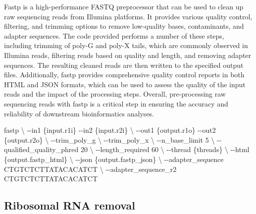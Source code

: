 \documentclass[
]{book}
\newenvironment{Shaded}{\begin{snugshade}}{\end{snugshade}}
\newcommand{\AttributeTok}[1]{\textcolor[rgb]{0.77,0.63,0.00}{#1}}
\newcommand{\DataTypeTok}[1]{\textcolor[rgb]{0.13,0.29,0.53}{#1}}
\newcommand{\ExtensionTok}[1]{#1}
\newcommand{\NormalTok}[1]{#1}
\begin{document}
Fastp is a high-performance FASTQ preprocessor that can be used to clean up raw sequencing reads from Illumina platforms. It provides various quality control, filtering, and trimming options to remove low-quality bases, contaminants, and adapter sequences. The code provided performs a number of these steps, including trimming of poly-G and poly-X tails, which are commonly observed in Illumina reads, filtering reads based on quality and length, and removing adapter sequences. The resulting cleaned reads are then written to the specified output files. Additionally, fastp provides comprehensive quality control reports in both HTML and JSON formats, which can be used to assess the quality of the input reads and the impact of the processing steps. Overall, pre-processing raw sequencing reads with fastp is a critical step in ensuring the accuracy and reliability of downstream bioinformatics analyses.

\small

\begin{Shaded}
\begin{Highlighting}[]
\ExtensionTok{fastp} \DataTypeTok{\textbackslash{}}
      \AttributeTok{{-}{-}in1}\NormalTok{ \{input.r1i\} }\AttributeTok{{-}{-}in2}\NormalTok{ \{input.r2i\} }\DataTypeTok{\textbackslash{}}
      \AttributeTok{{-}{-}out1}\NormalTok{ \{output.r1o\} }\AttributeTok{{-}{-}out2}\NormalTok{ \{output.r2o\} }\DataTypeTok{\textbackslash{}}
      \AttributeTok{{-}{-}trim\_poly\_g} \DataTypeTok{\textbackslash{}}
      \AttributeTok{{-}{-}trim\_poly\_x} \DataTypeTok{\textbackslash{}}
      \AttributeTok{{-}{-}n\_base\_limit}\NormalTok{ 5 }\DataTypeTok{\textbackslash{}}
      \AttributeTok{{-}{-}qualified\_quality\_phred}\NormalTok{ 20 }\DataTypeTok{\textbackslash{}}
      \AttributeTok{{-}{-}length\_required}\NormalTok{ 60 }\DataTypeTok{\textbackslash{}}
      \AttributeTok{{-}{-}thread}\NormalTok{ \{threads\} }\DataTypeTok{\textbackslash{}}
      \AttributeTok{{-}{-}html}\NormalTok{ \{output.fastp\_html\} }\DataTypeTok{\textbackslash{}}
      \AttributeTok{{-}{-}json}\NormalTok{ \{output.fastp\_json\} }\DataTypeTok{\textbackslash{}}
      \AttributeTok{{-}{-}adapter\_sequence}\NormalTok{ CTGTCTCTTATACACATCT }\DataTypeTok{\textbackslash{}}
      \AttributeTok{{-}{-}adapter\_sequence\_r2}\NormalTok{ CTGTCTCTTATACACATCT}
\end{Highlighting}
\end{Shaded}

\normalsize

\hypertarget{ribosomal-rna-removal-1}{%
\subsection*{Ribosomal RNA removal}\label{ribosomal-rna-removal-1}}
\end{document}
